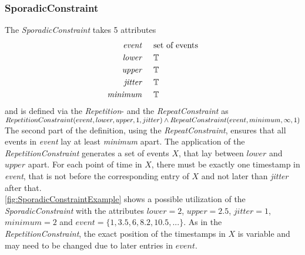 	\subsubsection{SporadicConstraint}
		The \emph{SporadicConstraint} takes 5 attributes
		\begin{align*}
			\emph{event} 	& \hspace{.5cm}\text{set of events}\\
			\emph{lower} 	& \hspace{.5cm}\mathbb{T}\\
			\emph{upper} 	& \hspace{.5cm}\mathbb{T}\\
			\emph{jitter}	& \hspace{.5cm}\mathbb{T}\\
			\emph{minimum}	& \hspace{.5cm}\mathbb{T}
		\end{align*}
		and is defined via the \emph{Repetition}- and the \emph{RepeatConstraint} as\\[10pt]
		\begin{math}
			RepetitionConstraint(event, lower, upper, 1, jitter)\\
			\land RepeatConstraint(event, minimum, \infty, 1)
		\end{math}\\[10pt]
		The second part of the definition, using the \emph{RepeatConstraint}, ensures that all events in \emph{event} lay at least \emph{minimum} apart. The application of the \emph{RepetitionConstraint} generates a set of events $X$, that lay between $lower$ and $upper$ apart. For each point of time in $X$, there must be exactly one timestamp in \emph{event}, that is not before the corresponding entry of $X$ and not later than \emph{jitter} after that.\\
		\ref{fig:SporadicConstraintExample} shows a possible utilization of the \emph{SporadicConstraint} with the attributes $lower=2$, $upper=2.5$, $jitter=1$, $minimum=2$ and $event=\{1, 3.5, 6, 8.2, 10.5,...\}$. As in the \emph{RepetitionConstraint}, the exact position of the timestamps in $X$ is variable and may need to be changed due to later entries in $event$.
